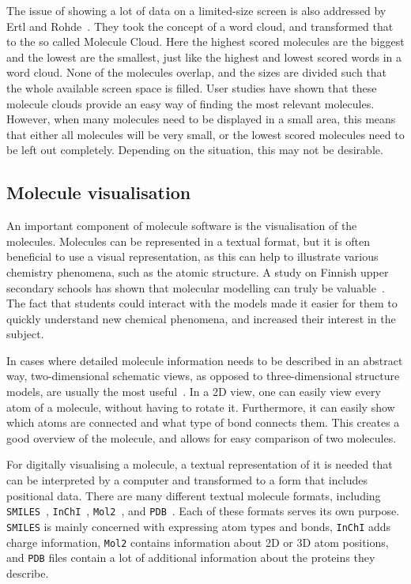 The issue of showing a lot of data on a limited-size screen is also addressed by Ertl and Rohde~\cite{ertl2012molecule}. They took the concept of a word cloud, and transformed that to the so called Molecule Cloud. Here the highest scored molecules are the biggest and the lowest are the smallest, just like the highest and lowest scored words in a word cloud. None of the molecules overlap, and the sizes are divided such that the whole available screen space is filled. User studies have shown that these molecule clouds provide an easy way of finding the most relevant molecules. However, when many molecules need to be displayed in a small area, this means that either all molecules will be very small, or the lowest scored molecules need to be left out completely. Depending on the situation, this may not be desirable.

\subsection{Molecule visualisation}
An important component of molecule software is the visualisation of the molecules. Molecules can be represented in a textual format, but it is often beneficial to use a visual representation, as this can help to illustrate various chemistry phenomena, such as the atomic structure. A study on Finnish upper secondary schools has shown that molecular modelling can truly be valuable~\cite{aksela2008computer}. The fact that students could interact with the models made it easier for them to quickly understand new chemical phenomena, and increased their interest in the subject.

In cases where detailed molecule information needs to be described in an abstract way, two-dimensional schematic views, as opposed to three-dimensional structure models, are usually the most useful~\cite{zhou2009molecular}. In a 2D view, one can easily view every atom of a molecule, without having to rotate it. Furthermore, it can easily show which atoms are connected and what type of bond connects them. This creates a good overview of the molecule, and allows for easy comparison of two molecules.

For digitally visualising a molecule, a textual representation of it is needed that can be interpreted by a computer and transformed to a form that includes positional data. There are many different textual molecule formats, including \verb|SMILES|~\cite{daylight1992daylight}, \verb|InChI|~\cite{heller2013inchi}, \verb|Mol2|~\cite{tripos2005tripos}, and \verb|PDB|~\cite{bernstein1977protein}. Each of these formats serves its own purpose. \verb|SMILES| is mainly concerned with expressing atom types and bonds, \verb|InChI| adds charge information, \verb|Mol2| contains information about 2D or 3D atom positions, and \verb|PDB| files contain a lot of additional information about the proteins they describe.

